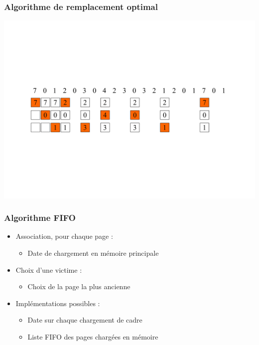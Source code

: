 \begin{frame}
\frametitle{Algorithme de remplacement optimal}
\includegraphics[width=\textwidth]{../illustration/remplacement_opt.pdf}
\end{frame}


\begin{frame}
\frametitle{Algorithme FIFO}
\begin{itemize}
\item Association, pour chaque page :
\begin{itemize}
\item Date de chargement en mémoire principale
\end{itemize}
\item Choix d'une victime :
\begin{itemize}
\item Choix de la page la plus ancienne
\end{itemize}
\item Implémentations possibles :
\begin{itemize}
\item Date sur chaque chargement de cadre
\item Liste FIFO des pages chargées en mémoire
\end{itemize}
\end{itemize}
\end{frame}


